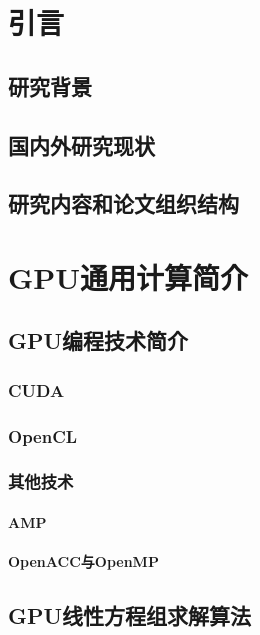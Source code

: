 \documentclass[master,xetex]{thuthesis}
\begin{document}
\graphicspath{{figures/}}


\frontmatter


\tableofcontents

%


\mainmatter

\chapter{引言}
\section{研究背景}
\section{国内外研究现状}
\section{研究内容和论文组织结构}

\chapter{GPU通用计算简介}
\section{GPU编程技术简介}

\subsection{CUDA}
\subsection{OpenCL}

\subsection{其他技术}
\subsubsection{AMP}
\subsubsection{OpenACC与OpenMP}

\section{GPU线性方程组求解算法}
\end{document}
